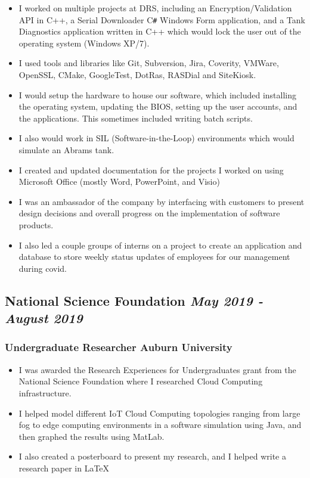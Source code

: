\documentclass{article}
\begin{document}
\begin{itemize}
    \item I worked on multiple projects at DRS, including
     an Encryption/Validation API in C++, a Serial Downloader 
     C\verb|#| Windows Form application, and a Tank Diagnostics 
     application written in C++ which would lock the user out of 
     the operating system (Windows XP/7).
    \item I used tools and libraries like Git,
    Subversion, Jira, Coverity, VMWare, OpenSSL, CMake, GoogleTest, 
    DotRas, RASDial and SiteKiosk.
    \item I would setup the hardware to house our software, 
     which included installing the operating system, updating the BIOS,
     setting up the user accounts, and the applications. This sometimes
     included writing batch scripts.
    \item I also would work in SIL (Software-in-the-Loop) environments which
     would simulate an Abrams tank.
    \item I created and updated documentation for the projects I worked on
     using Microsoft Office (mostly Word, PowerPoint, and Visio)
    \item I was an ambassador of the company by interfacing with customers
     to present design decisions and overall progress on the implementation
     of software products.
    \item I also led a couple groups of interns on a project to create 
    an application and database to store weekly status updates of employees
    for our management during covid.
    
\end{itemize}

\subsection*{\hspace*{0.15cm} National Science Foundation \hfill \textit{May 2019 - August 2019}}

\subsubsection*{\hspace*{0.15cm} Undergraduate Researcher \hfill Auburn University}

\begin{itemize}
    \item I was awarded the Research Experiences for Undergraduates grant from 
    the National Science Foundation where I researched Cloud Computing infrastructure.
    \item I helped model different IoT Cloud Computing topologies ranging from large
     fog to edge computing environments in a software simulation using Java, and
     then graphed the results using MatLab.
    \item I also created a posterboard to present my research, and I helped
     write a research paper in {\LaTeX}
    
\end{itemize}
\end{document}
